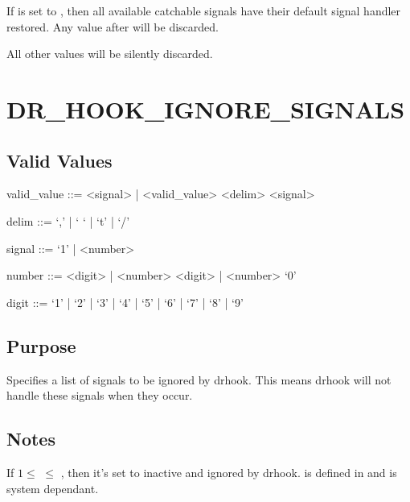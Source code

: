 \documentclass[letterpaper,10pt,english]{sphinxmanual}
\begin{document}
\sphinxAtStartPar
If  is set to , then all available catchable signals have their default signal handler restored. Any value after  will be discarded.

\sphinxAtStartPar
All other values will be silently discarded.


\section{DR\_HOOK\_IGNORE\_SIGNALS}
\label{\detokenize{flag/flag:dr-hook-ignore-signals}}\label{\detokenize{flag/flag:id18}}

\subsection{Valid Values}
\label{\detokenize{flag/flag:id19}}
\begin{DUlineblock}{0em}
\item[] valid\_value ::= \textless{}signal\textgreater{} |  \textless{}valid\_value\textgreater{} \textless{}delim\textgreater{} \textless{}signal\textgreater{}
\item[] delim ::= ‘,’ | ‘ ‘ | ‘t’ | ‘/’
\item[] signal ::= ‘\sphinxhyphen{}1’ | \textless{}number\textgreater{}
\item[] number ::= \textless{}digit\textgreater{} | \textless{}number\textgreater{} \textless{}digit\textgreater{} | \textless{}number\textgreater{} ‘0’
\item[] digit ::= ‘1’ | ‘2’ | ‘3’ | ‘4’ | ‘5’ | ‘6’ | ‘7’ | ‘8’ | ‘9’
\end{DUlineblock}


\subsection{Purpose}
\label{\detokenize{flag/flag:id20}}
\sphinxAtStartPar
Specifies a list of signals to be ignored by drhook. This means drhook will not handle these signals when they occur.


\subsection{Notes}
\label{\detokenize{flag/flag:id21}}
\sphinxAtStartPar
If \(1 \leq\)  \(\leq\) , then it’s set to inactive and ignored by drhook.  is defined in  and is system dependant.
\end{document}
